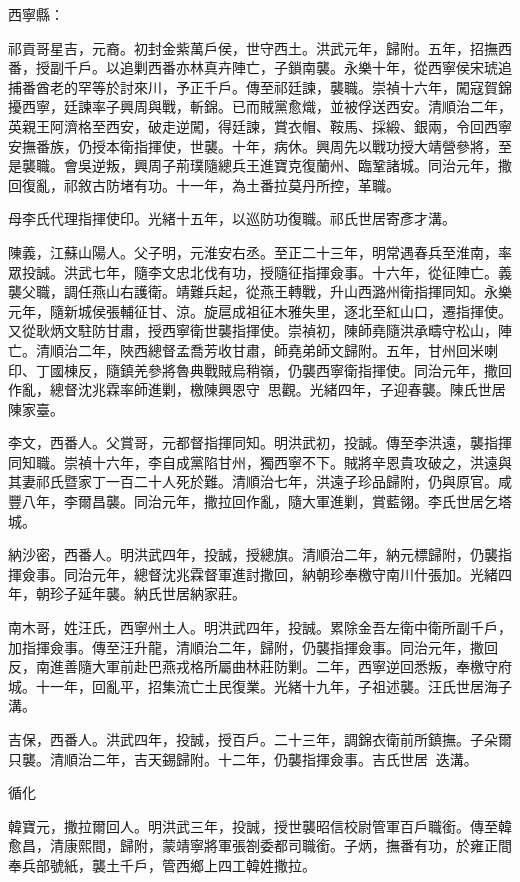\begin{pinyinscope}
西寧縣：

祁貢哥星吉，元裔。初封金紫萬戶侯，世守西土。洪武元年，歸附。五年，招撫西番，授副千戶。以追剿西番亦林真卉陣亡，子鎖南襲。永樂十年，從西寧侯宋琥追捕番酋老的罕等於討來川，予正千戶。傳至祁廷諫，襲職。崇禎十六年，闖寇賀錦擾西寧，廷諫率子興周與戰，斬錦。已而賊黨愈熾，並被俘送西安。清順治二年，英親王阿濟格至西安，破走逆闖，得廷諫，賞衣帽、鞍馬、採緞、銀兩，令回西寧安撫番族，仍授本衛指揮使，世襲。十年，病休。興周先以戰功授大靖營參將，至是襲職。會吳逆叛，興周子荊璞隨總兵王進寶克復蘭州、臨鞏諸城。同治元年，撒回復亂，祁敘古防堵有功。十一年，為土番拉莫丹所控，革職。

母李氏代理指揮使印。光緒十五年，以巡防功復職。祁氏世居寄彥才溝。

陳義，江蘇山陽人。父子明，元淮安右丞。至正二十三年，明常遇春兵至淮南，率眾投誠。洪武七年，隨李文忠北伐有功，授隨征指揮僉事。十六年，從征陣亡。義襲父職，調任燕山右護衛。靖難兵起，從燕王轉戰，升山西潞州衛指揮同知。永樂元年，隨新城侯張輔征甘、涼。旋扈成祖征木雅失里，逐北至紅山口，遷指揮使。又從耿炳文駐防甘肅，授西寧衛世襲指揮使。崇禎初，陳師堯隨洪承疇守松山，陣亡。清順治二年，陜西總督孟喬芳收甘肅，師堯弟師文歸附。五年，甘州回米喇印、丁國棟反，隨鎮羌參將魯典戰賊烏稍嶺，仍襲西寧衛指揮使。同治元年，撒回作亂，總督沈兆霖率師進剿，檄陳興恩守思觀。光緒四年，子迎春襲。陳氏世居陳家臺。

李文，西番人。父賞哥，元都督指揮同知。明洪武初，投誠。傳至李洪遠，襲指揮同知職。崇禎十六年，李自成黨陷甘州，獨西寧不下。賊將辛恩貴攻破之，洪遠與其妻祁氏暨家丁一百二十人死於難。清順治七年，洪遠子珍品歸附，仍與原官。咸豐八年，李爾昌襲。同治元年，撒拉回作亂，隨大軍進剿，賞藍翎。李氏世居乞塔城。

納沙密，西番人。明洪武四年，投誠，授總旗。清順治二年，納元標歸附，仍襲指揮僉事。同治元年，總督沈兆霖督軍進討撒回，納朝珍奉檄守南川什張加。光緒四年，朝珍子延年襲。納氏世居納家莊。

南木哥，姓汪氏，西寧州土人。明洪武四年，投誠。累除金吾左衛中衛所副千戶，加指揮僉事。傳至汪升龍，清順治二年，歸附，仍襲指揮僉事。同治元年，撒回反，南進善隨大軍前赴巴燕戎格所屬曲林莊防剿。二年，西寧逆回悉叛，奉檄守府城。十一年，回亂平，招集流亡土民復業。光緒十九年，子祖述襲。汪氏世居海子溝。

吉保，西番人。洪武四年，投誠，授百戶。二十三年，調錦衣衛前所鎮撫。子朵爾只襲。清順治二年，吉天錫歸附。十二年，仍襲指揮僉事。吉氏世居迭溝。

循化：

韓寶元，撒拉爾回人。明洪武三年，投誠，授世襲昭信校尉管軍百戶職銜。傳至韓愈昌，清康熙間，歸附，蒙靖寧將軍張劄委都司職銜。子炳，撫番有功，於雍正間奉兵部號紙，襲土千戶，管西鄉上四工韓姓撒拉。


\end{pinyinscope}

